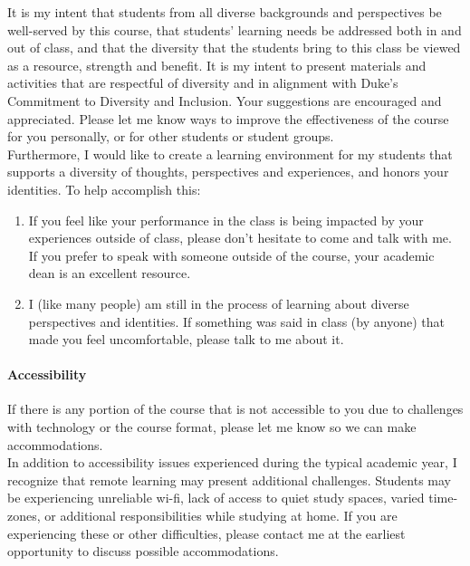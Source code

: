 \documentclass[11pt]{article}
\begin{document}
It is my intent that students from all diverse backgrounds and perspectives be well-served by this course, that students’ learning needs be addressed both in and out of class, and that the diversity that the students bring to this class be viewed as a resource, strength and benefit. It is my intent to present materials and activities that are respectful of diversity and in alignment with Duke’s Commitment to Diversity and Inclusion. Your suggestions are encouraged and appreciated. Please let me know ways to improve the effectiveness of the course for you personally, or for other students or student groups. \\

Furthermore, I would like to create a learning environment for my students that supports a diversity of thoughts, perspectives and experiences, and honors your identities. To help accomplish this:

\begin{enumerate}
\item If you feel like your performance in the class is being impacted by your experiences outside of class, please don’t hesitate to come and talk with me. If you prefer to speak with someone outside of the course, your academic dean is an excellent resource.
\item   I (like many people) am still in the process of learning about diverse perspectives and identities. If something was said in class (by anyone) that made you feel uncomfortable, please talk to me about it.
\end{enumerate}

\paragraph{Accessibility}

If there is any portion of the course that is not accessible to you due to challenges with technology or the course format, please let me know so we can make accommodations.\\

In addition to accessibility issues experienced during the typical academic year, I recognize that remote learning may present additional challenges. Students may be experiencing unreliable wi-fi, lack of access to quiet study spaces, varied time-zones, or additional responsibilities while studying at home. If you are experiencing these or other difficulties, please contact me at the earliest opportunity to discuss possible accommodations. \\
\end{document}
